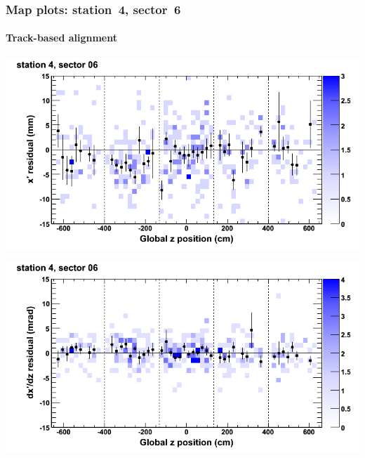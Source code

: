 \documentclass[compress]{beamer}
\begin{document}
\begin{frame}
\frametitle{Map plots: station~4, sector~6}
\framesubtitle{Track-based alignment}
\includegraphics[width=0.5\linewidth]{mapplots_re05/DTvsz_st4sec06_x.png}

\includegraphics[width=0.5\linewidth]{mapplots_re05/DTvsz_st4sec06_dxdz.png}
\end{frame}
\end{document}
